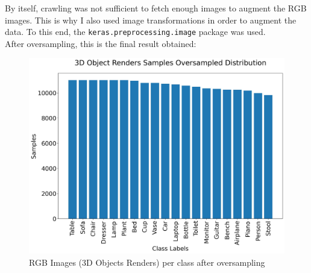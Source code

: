 \documentclass[11pt,a4paper]{article}
\begin{document}
\noindent
By itself, crawling was not sufficient to fetch enough images to augment the RGB images. This is why I also used image transformations in order to augment the data. To this end, the \texttt{keras.preprocessing.image} package was used.\\
After oversampling, this is the final result obtained:
\begin{figure}[H]
    \centering
    \includegraphics[scale=0.35]{imgs/3d-object-renders-transformations-oversampled-distribution.jpg}
    \caption{RGB Images (3D Objects Renders) per class after oversampling}
\end{figure}
\end{document}
